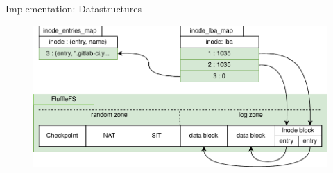 \documentclass{beamer}
\begin{document}
\begin{frame}{Implementation: Datastructures}
	\begingroup
	\small
	\begin{figure}[h]
		\centering
			  \includegraphics[width=1.0\linewidth]{resources/images/fluffle-inode-sync.pdf}
	\end{figure}
	\endgroup
\end{frame}
\end{document}
